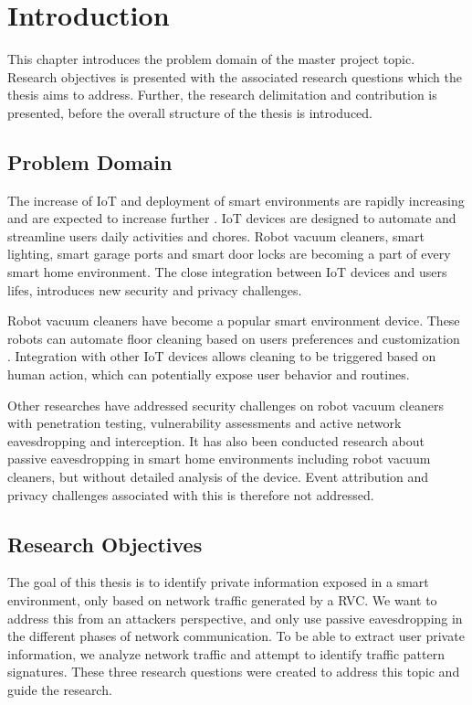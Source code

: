 \chapter{Introduction}
This chapter introduces the problem domain of the master project topic. Research objectives is presented with the associated research questions which the thesis aims to address. Further, the research delimitation and contribution is presented, before the overall structure of the thesis is introduced. 
 
\section{Problem Domain}

The increase of \gls{IoT} and deployment of smart environments are rapidly increasing and are expected to increase further \cite{iotgrowth}. \gls{IoT} 
devices are designed to automate and streamline users daily activities and chores. Robot vacuum cleaners, smart lighting, smart garage ports and smart door locks are becoming a part of every smart home environment. The close integration between \gls{IoT} devices and users lifes, introduces new security and privacy challenges.

Robot vacuum cleaners have become a popular smart environment device. These robots can automate floor cleaning based on users preferences and customization \cite{roboticvacuumcleaner2021}. Integration with other \gls{IoT} devices allows cleaning to be triggered based on human action, which can potentially expose user behavior and routines. 

Other researches have addressed security challenges on robot vacuum cleaners with penetration testing, vulnerability assessments and active network eavesdropping and interception. It has also been conducted research about passive eavesdropping in smart home environments including robot vacuum cleaners, but without detailed analysis of the device. Event attribution and privacy challenges associated with this is therefore not addressed.

\section{Research Objectives}

The goal of this thesis is to identify private information exposed in a smart environment, only based on network traffic generated by a \gls{RVC}. We want to address this from an attackers perspective, and only use passive eavesdropping in the different phases of network communication. To be able to extract user private information, we analyze network traffic and attempt to identify traffic pattern signatures. These three research questions were created to address this topic and guide the research.

